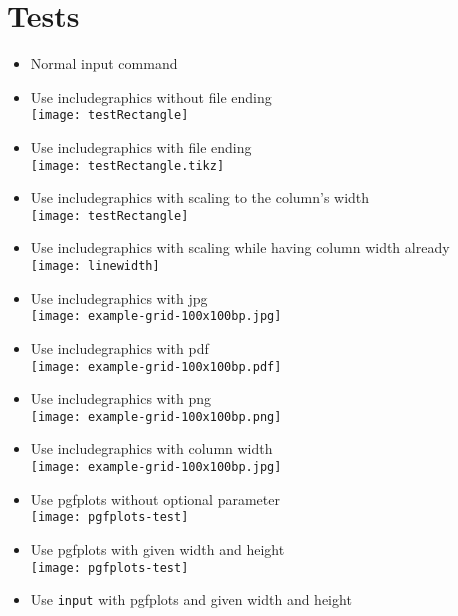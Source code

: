\documentclass[twocolumn]{article}
\begin{document}
	\section*{Tests}
	\begin{itemize}
		\item Normal input command\\%
		\item Use includegraphics without file ending\\%
			\texttt{[image: testRectangle]}%
		\item Use includegraphics with file ending\\%
			\texttt{[image: testRectangle.tikz]}%
		\item Use includegraphics with scaling to the column's width\\%
			\texttt{[image: testRectangle]}%
		\item Use includegraphics with scaling while having column width already\\%
			\texttt{[image: linewidth]}%
		\item Use includegraphics with jpg\\%
			\texttt{[image: example-grid-100x100bp.jpg]}%
		\item Use includegraphics with pdf\\%
			\texttt{[image: example-grid-100x100bp.pdf]}%
		\item Use includegraphics with png\\%
			\texttt{[image: example-grid-100x100bp.png]}%
		\item Use includegraphics with column width\\%
			\texttt{[image: example-grid-100x100bp.jpg]}%
		\item Use pgfplots without optional parameter\\%
			\texttt{[image: pgfplots-test]}%
		\item Use pgfplots with given width and height\\%
			\texttt{[image: pgfplots-test]}%
		\item Use \texttt{input} with pgfplots and given width and height\\%
			\makeatletter%
			\gdef\tikzscale@width{\linewidth}%
			\gdef\tikzscale@height{0.3\linewidth}%
			\makeatother%
	\end{itemize}
\end{document}

